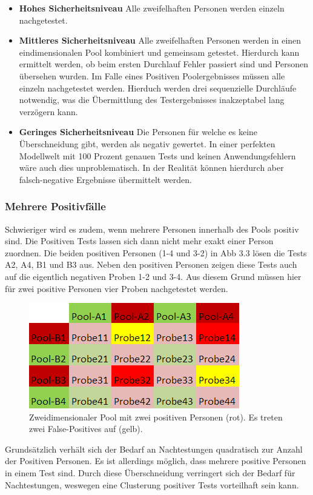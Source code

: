 \begin{itemize}
	\item \textbf{Hohes Sicherheitsniveau} Alle zweifelhaften Personen werden einzeln nachgetestet.
	\item \textbf{Mittleres Sicherheitsniveau} Alle zweifelhaften Personen werden in einen eindimensionalen Pool kombiniert und gemeinsam getestet. Hierdurch kann ermittelt werden, ob beim ersten Durchlauf Fehler passiert sind und Personen übersehen wurden. Im Falle eines Positiven Poolergebnisses müssen alle einzeln nachgetestet werden. Hierduch werden drei sequenzielle Durchläufe notwendig, was die Übermittlung des Testergebnisses inakzeptabel lang verzögern kann.
	\item \textbf{Geringes Sicherheitsniveau} Die Personen für welche es keine Überschneidung gibt, werden als negativ gewertet. In einer perfekten Modellwelt mit 100 Prozent genauen Tests und keinen Anwendungsfehlern wäre auch dies unproblematisch. In der Realität können hierdurch aber falsch-negative Ergebnisse übermittelt werden.
\end{itemize}

\subsubsection{Mehrere Positivfälle}

Schwieriger wird es zudem, wenn mehrere Personen innerhalb des Pools positiv sind.
Die Positiven Tests lassen sich dann nicht mehr exakt einer Person zuordnen.
Die beiden positiven Personen (1-4 und 3-2) in Abb 3.3 lösen die Tests A2, A4, B1 und B3 aus.
Neben den positiven Personen zeigen diese Tests auch auf die eigentlich negativen Proben 1-2 und 3-4.
Aus diesem Grund müssen hier für zwei positive Personen vier Proben nachgetestet werden.

\begin{figure}[h]
	\centering
	\includegraphics[height=.25\textwidth]{img/2d_Pool_2Positiv}
	\caption{Zweidimensionaler Pool mit zwei positiven Personen (rot). Es treten zwei False-Positives auf (gelb).\footnotemark}
\end{figure}

Grundsätzlich verhält sich der Bedarf an Nachtestungen quadratisch zur Anzahl der Positiven Personen.
Es ist allerdings möglich, dass mehrere positive Personen in einem Test sind.
Durch diese Überschneidung verringert sich der Bedarf für Nachtestungen, weswegen eine Clusterung positiver Tests vorteilhaft sein kann.


\cleardoublepage
